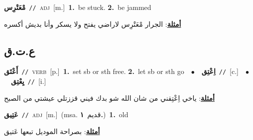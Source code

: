 \documentclass[10pt,a4paper,twoside]{article} %
\begin{document}
\begin{multicols}{2}
{\setlength\topsep{0pt}\textbf{\foreignlanguage{arabic}{مْعَتْرِس}}\ {\color{gray}\texttt{//}\color{black}}\ \textsc{adj}\ [m.]\ \textbf{1.}~be stuck.  \textbf{2.}~be jammed\  \begin{flushright}\color{gray}\foreignlanguage{arabic}{\textbf{\underline{\foreignlanguage{arabic}{أمثلة}}}: الجرار مْعَتْرِس لاراضي يفتح ولا يسكر وأنا بديش أكسره}\end{flushright}\color{black}} \vspace{2mm}

\vspace{-3mm}
\subsection*{\color{blue}\foreignlanguage{arabic}{ع.ت.ق}\color{blue}{}} 

{\setlength\topsep{0pt}\textbf{\foreignlanguage{arabic}{أَعْتَق}}\ {\color{gray}\texttt{//}\color{black}}\ \textsc{verb}\ [p.]\ \textbf{1.}~set sb or sth free.  \textbf{2.}~let sb or sth go\ \ $\bullet$\ \ \setlength\topsep{0pt}\textbf{\foreignlanguage{arabic}{اِعْتِق}}\ {\color{gray}\texttt{//}\color{black}}\ [c.]\ \ $\bullet$\ \ \setlength\topsep{0pt}\textbf{\foreignlanguage{arabic}{يِعْتِق}}\ {\color{gray}\texttt{//}\color{black}}\ [i.]\  \begin{flushright}\color{gray}\foreignlanguage{arabic}{\textbf{\underline{\foreignlanguage{arabic}{أمثلة}}}: ياخي اِعْتِقني من شان الله شو بدك فيني قززتلي عيشتي من الصبح}\end{flushright}\color{black}} \vspace{2mm}

{\setlength\topsep{0pt}\textbf{\foreignlanguage{arabic}{عَتِيق}}\ {\color{gray}\texttt{//}\color{black}}\ \textsc{adj}\ [m.]\ \color{gray}(msa. \foreignlanguage{arabic}{قديم}~\foreignlanguage{arabic}{\textbf{١.}})\color{black}\ \textbf{1.}~old\  \begin{flushright}\color{gray}\foreignlanguage{arabic}{\textbf{\underline{\foreignlanguage{arabic}{أمثلة}}}: بصراحة الموديل تبعها عَتيق}\end{flushright}\color{black}} \vspace{2mm}


\end{multicols}
\end{document}

